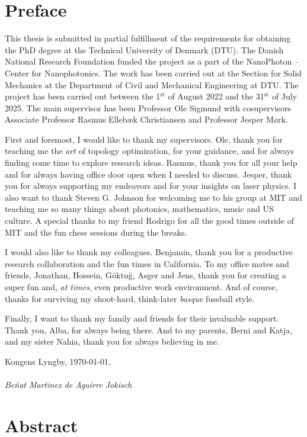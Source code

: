 \chapter*{Preface}
This thesis is submitted in partial fulfillment of the requirements for obtaining
the PhD degree at the Technical University of Denmark
(DTU). The Danish National Research Foundation funded the project as a part of
the NanoPhoton -- Center for Nanophotonics. The work has been carried out at the
Section for Solid Mechanics at the Department of Civil and Mechanical Engineering
at DTU. The project has been carried out between the 1$^\text{st}$ of August 2022 and the 31$^\text{st}$
of July 2025. The main supervisor has been Professor Ole Sigmund with cosupervisors Associate Professor Rasmus Ellebæk Christiansen and Professor Jesper
Mørk.

First and foremost, I would like to thank my supervisors. Ole, thank you for teaching me the \emph{art} of topology optimization, for your guidance, and for always
finding some time to explore research ideas. Rasmus, thank you for all your help and for always having office door open when I needed to discuss.
Jesper, thank you for always supporting my endeavors and for your insights on laser physics. I also want to thank Steven G. Johnson for welcoming me to his group at MIT and teaching me so many things about photonics,
mathematics, music and US culture. A special thanks to my friend Rodrigo for all the good times outside of MIT and the fun chess sessions 
during the breaks.

I would also like to thank my colleagues. Benjamin, thank you
for a productive research collaboration and the fun times in California. To my office mates and friends, Jonathan, Hossein, Göktuğ, Asger and Jens, thank you for creating 
a super fun and, \emph{at times}, even productive work environment. And of course, thanks for surviving my shoot-hard, think-later \emph{basque} fussball style.


Finally, I want to thank my family and friends for their invaluable support. Thank you, Alba, for always being there. 
And to my parents, Berni and Katja, and my sister Nahia, thank you for always believing in me.

\noindent Kongens Lyngby, \today,\\
\vspace{0.1cm}\\
\noindent \textit{Beñat Martinez de Aguirre Jokisch}

\chapter*{Abstract}

